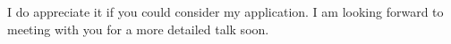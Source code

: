\documentclass[11pt, a4paper]{awesome-cv} %
\begin{document}
\begin{cvletter}
I do appreciate it if you could consider my application. I am looking forward to meeting with you for a more detailed talk soon.

\end{cvletter}


\end{document}
